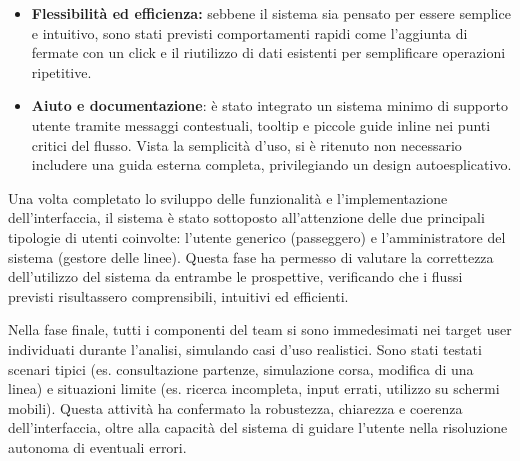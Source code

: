 \begin{itemize}
    \item \textbf{Flessibilità ed efficienza:} sebbene il sistema sia pensato per essere semplice e intuitivo, sono stati previsti comportamenti rapidi come l’aggiunta di fermate con un click e il riutilizzo di dati esistenti per semplificare operazioni ripetitive.
    \item \textbf{Aiuto e documentazione}: è stato integrato un sistema minimo di supporto utente tramite messaggi contestuali, tooltip e piccole guide inline nei punti critici del flusso. Vista la semplicità d’uso, si è ritenuto non necessario includere una guida esterna completa, privilegiando un design autoesplicativo.
\end{itemize}

Una volta completato lo sviluppo delle funzionalità e l’implementazione dell’interfaccia, il sistema è stato sottoposto all’attenzione delle due principali tipologie di utenti coinvolte: l’utente generico (passeggero) e l’amministratore del sistema (gestore delle linee).
Questa fase ha permesso di valutare la correttezza dell’utilizzo del sistema da entrambe le prospettive, verificando che i flussi previsti risultassero comprensibili, intuitivi ed efficienti.

Nella fase finale, tutti i componenti del team si sono immedesimati nei target user individuati durante l’analisi, simulando casi d’uso realistici. Sono stati testati scenari tipici (es. consultazione partenze, simulazione corsa, modifica di una linea) e situazioni limite (es. ricerca incompleta, input errati, utilizzo su schermi mobili).
Questa attività ha confermato la robustezza, chiarezza e coerenza dell’interfaccia, oltre alla capacità del sistema di guidare l’utente nella risoluzione autonoma di eventuali errori.













